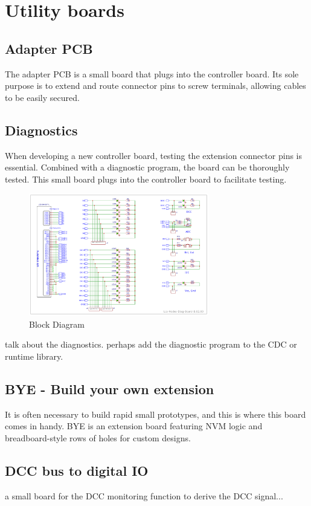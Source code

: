 \chapter{Utility boards}

\section{Adapter PCB}

The adapter PCB is a small board that plugs into the controller board. Its sole purpose is to extend and route connector pins to screw terminals, allowing cables to be easily secured.

\section{Diagnostics}

When developing a new controller board, testing the extension connector pins is essential. Combined with a diagnostic program, the board can be thoroughly tested. This small board plugs into the controller board to facilitate testing.

\begin{figure}[htbp]
    \centering
    \includegraphics[page=1, width=0.7\textwidth]{./Schematics/Schematic_LcsNodes-Diagnostic-Board.pdf}
    \caption{Block Diagram}
\end{figure}
\FloatBarrier

talk about the diagnostics. perhaps add the diagnostic program to the CDC or runtime library.

\section{BYE - Build your own extension}

It is often necessary to build rapid small prototypes, and this is where this board comes in handy.
BYE is an extension board featuring NVM logic and breadboard-style rows of holes for custom designs. 

\section{DCC bus to digital IO}

a small board for the DCC monitoring function to derive the DCC signal...

